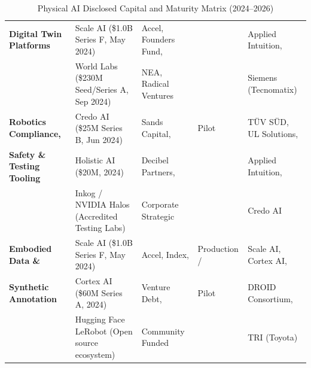 \documentclass[11pt,a4paper]{article}
\begin{document}
\begin{table}[h!]
\begin{tabularx}{\textwidth}{@{}l p{4.2cm} p{3.2cm} l X@{}}
\textbf{Digital Twin Platforms} & Scale AI (\$1.0B Series F, May 2024)\newline & Accel, Founders Fund, & & Applied Intuition, \\
& World Labs (\$230M Seed/Series A, Sep 2024) & NEA, Radical Ventures & & Siemens (Tecnomatix) \\
\addlinespace
\textbf{Robotics Compliance,} & Credo AI (\$25M Series B, Jun 2024)\newline & Sands Capital, & Pilot & TÜV SÜD, UL Solutions, \\
\textbf{Safety \& Testing Tooling} & Holistic AI (\$20M, 2024)\newline & Decibel Partners, & & Applied Intuition, \\
& Inkog / NVIDIA Halos (Accredited Testing Labs) & Corporate Strategic & & Credo AI \\
\addlinespace
\textbf{Embodied Data \&} & Scale AI (\$1.0B Series F, May 2024)\newline & Accel, Index, & Production / & Scale AI, Cortex AI, \\
\textbf{Synthetic Annotation} & Cortex AI (\$60M Series A, 2024)\newline & Venture Debt, & Pilot & DROID Consortium, \\
& Hugging Face LeRobot (Open source ecosystem) & Community Funded & & TRI (Toyota) \\
\bottomrule
\end{tabularx}
\caption{Physical AI Disclosed Capital and Maturity Matrix (2024--2026)}
\end{table}
\end{document}
